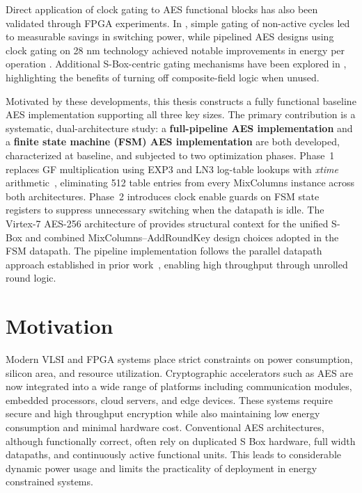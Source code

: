 Direct application of clock gating to AES functional blocks has also been validated through 
FPGA experiments. In \cite{chodorowski2021_clockgated_aes}, simple gating of non-active
cycles led to measurable savings in switching power, while pipelined AES designs using
clock gating on 28 nm technology achieved notable improvements in energy per operation
\cite{prasanth2021_lowpower_aes_clockgating}. Additional S-Box-centric gating mechanisms 
have been explored in \cite{subramanian2021_adaptive_clockgated_sbox}, highlighting the 
benefits of turning off composite-field logic when unused.

Motivated by these developments, this thesis constructs a fully functional baseline AES
implementation supporting all three key sizes. The primary contribution is a systematic,
dual-architecture study: a \textbf{full-pipeline AES implementation} and a \textbf{finite
state machine (FSM) AES implementation} are both developed, characterized at baseline, and
subjected to two optimization phases. Phase~1 replaces GF multiplication using EXP3 and LN3
log-table lookups with \textit{xtime} arithmetic~\cite{wolkerstorfer_xtime_2002}, eliminating
512 table entries from every MixColumns instance across both architectures. Phase~2 introduces
clock enable guards on FSM state registers to suppress unnecessary switching when the datapath
is idle. The Virtex-7 AES-256 architecture of \cite{gunasekaran_aes256_virtex7} provides
structural context for the unified S-Box and combined MixColumns--AddRoundKey design choices
adopted in the FSM datapath. The pipeline implementation follows the parallel datapath
approach established in prior work~\cite{good_pipelined_aes_2005}, enabling high throughput
through unrolled round logic.


\section{Motivation}

Modern VLSI and FPGA systems place strict constraints on power consumption, silicon area, and resource utilization. Cryptographic accelerators such as AES are now integrated into a wide range of platforms including communication modules, embedded processors, cloud servers, and edge devices. These systems require secure and high throughput encryption while also maintaining low energy consumption and minimal hardware cost. Conventional AES architectures, although functionally correct, often rely on duplicated S Box hardware, full width datapaths, and continuously active functional units. This leads to considerable dynamic power usage and limits the practicality of deployment in energy constrained systems.

